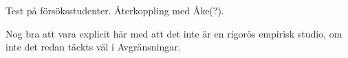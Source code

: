 \begin{binge}
  Test på försöksstudenter. Återkoppling med Åke(?).

  Nog bra att vara explicit här med att det inte är en rigorös empirisk
  studio, om inte det redan täckts väl i Avgränsningar.

\end{binge}
